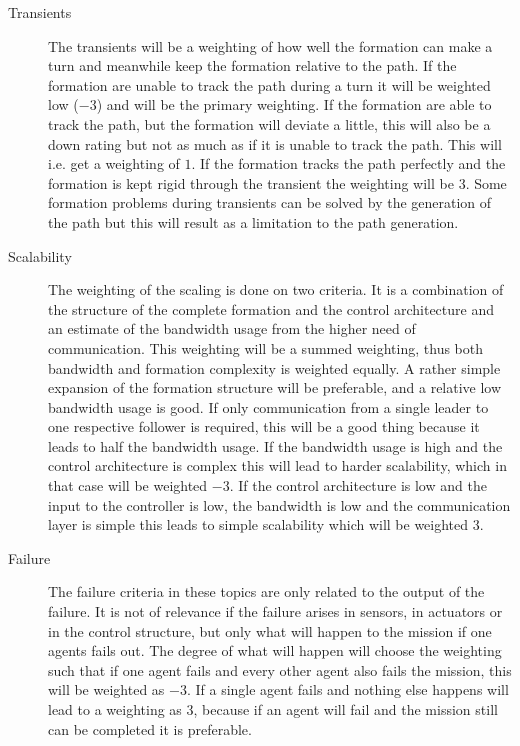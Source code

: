 \begin{description}
\item[Transients] The transients will be a weighting of how well the formation can make a turn and meanwhile keep the formation relative to the path. If the formation are unable to track the path during a turn it will be weighted low ($-3$) and will be the primary weighting. If the formation are able to track the path, but the formation will deviate a little, this will also be a down rating but not as much as if it is unable to track the path. This will i.e. get a weighting of $1$. If the formation tracks the path perfectly and the formation is kept rigid through the transient the weighting will be $3$. Some formation problems during transients can be solved by the generation of the path but this will result as a limitation to the path generation. 

\item[Scalability] The weighting of the scaling is done on two criteria. It is a combination of the structure of the complete formation and the control architecture and an estimate of the bandwidth usage from the higher need of communication. This weighting will be a summed weighting, thus both bandwidth and formation complexity is weighted equally. A rather simple expansion of the formation structure will be preferable, and a relative low bandwidth usage is good. If only communication from a single leader to one respective follower is required, this will be a good thing because it leads to half the bandwidth usage. If the bandwidth usage is high and the control architecture is complex this will lead to harder scalability, which in that case will be weighted $-3$. If the control architecture is low and the input to the controller is low, the bandwidth is low and the communication layer is simple this leads to simple scalability which will be weighted $3$.

\item[Failure] The failure criteria in these topics are only related to the output of the failure. It is not of relevance if the failure arises in sensors, in actuators or in the control structure, but only what will happen to the mission if one agents fails out. The degree of what will happen will choose the weighting such that if one agent fails and every other agent also fails the mission, this will be weighted as $-3$. If a single agent fails and nothing else happens will lead to a weighting as $3$, because if an agent will fail and the mission still can be completed it is preferable.
\end{description}

